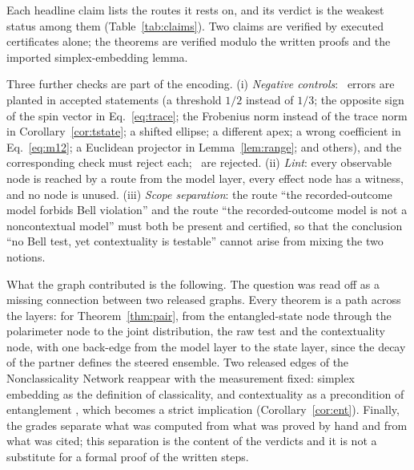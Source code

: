 Each headline claim lists the routes it rests on, and its verdict is the weakest status among them (Table~\ref{tab:claims}). Two claims are verified by executed certificates alone; the theorems are verified modulo the written proofs and the imported simplex-embedding lemma.

\begin{table}[t]
\caption{Headline claims, the routes they rest on, and the verdict of the closure. C1: the decay as a fixed covariant measurement and the $V\!-\!A$ kernels. C2: single-setting data admit a recorded-outcome model that is not noncontextual. C3--C4: Theorems~\ref{thm:half}, \ref{thm:pair}. C5--C6: Theorems~\ref{thm:one}, \ref{thm:onepair}. C7: Theorem~\ref{thm:spinj}. C8--C11: applications to top-quark pairs, hyperon pairs, top-quark polarimeters and vector mesons.}
\label{tab:claims}

\end{table}

Three further checks are part of the encoding. (i) \emph{Negative controls}: \nControls\ errors are planted in accepted statements (a threshold $1/2$ instead of $1/3$; the opposite sign of the spin vector in Eq.~\eqref{eq:trace}; the Frobenius norm instead of the trace norm in Corollary~\ref{cor:tstate}; a shifted ellipse; a different apex; a wrong coefficient in Eq.~\eqref{eq:m12}; a Euclidean projector in Lemma~\ref{lem:range}; and others), and the corresponding check must reject each; \nControlsRejected\ are rejected. (ii) \emph{Lint}: every observable node is reached by a route from the model layer, every effect node has a witness, and no node is unused. (iii) \emph{Scope separation}: the route ``the recorded-outcome model forbids Bell violation'' and the route ``the recorded-outcome model is not a noncontextual model'' must both be present and certified, so that the conclusion ``no Bell test, yet contextuality is testable'' cannot arise from mixing the two notions.

What the graph contributed is the following. The question was read off as a missing connection between two released graphs. Every theorem is a path across the layers: for Theorem~\ref{thm:pair}, from the entangled-state node through the polarimeter node to the joint distribution, the raw test and the contextuality node, with one back-edge from the model layer to the state layer, since the decay of the partner defines the steered ensemble. Two released edges of the Nonclassicality Network reappear with the measurement fixed: simplex embedding as the definition of classicality, and contextuality as a precondition of entanglement \cite{plavala2024}, which becomes a strict implication (Corollary~\ref{cor:ent}). Finally, the grades separate what was computed from what was proved by hand and from what was cited; this separation is the content of the verdicts and it is not a substitute for a formal proof of the written steps.
